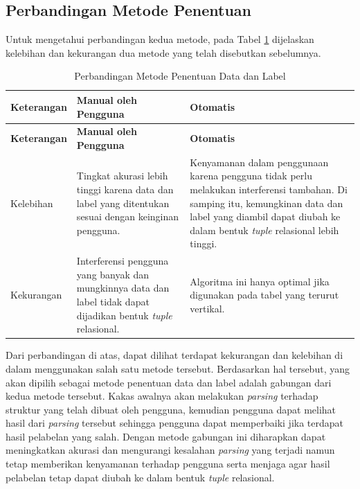 
	\subsection{Perbandingan Metode Penentuan}
	Untuk mengetahui perbandingan kedua metode, pada Tabel \ref{MetodePenentuan} dijelaskan kelebihan dan kekurangan dua metode yang telah disebutkan sebelumnya.
	\begin{small}
	\begin{longtable}{ | p{3cm} | p{4cm} | p{4cm} | }
	    \caption{Perbandingan Metode Penentuan Data dan Label}
	    \label{MetodePenentuan}\\ \hline
	    \centering\bfseries{Keterangan} & \centering\bfseries{Manual oleh Pengguna} & \centering\bfseries{Otomatis} \tabularnewline \hline
	    \endfirsthead
	    \hline
	    \centering\bfseries{Keterangan} & \centering\bfseries{Manual oleh Pengguna} & \centering\bfseries{Otomatis} \tabularnewline \hline
	    \endhead
	    Kelebihan & Tingkat akurasi lebih tinggi karena data dan label yang ditentukan sesuai dengan keinginan pengguna. & Kenyamanan dalam penggunaan karena pengguna tidak perlu melakukan interferensi tambahan. Di samping itu, kemungkinan data dan label yang diambil dapat diubah ke dalam bentuk \textit{tuple} relasional lebih tinggi. \\ \hline
	    Kekurangan & Interferensi pengguna yang banyak dan mungkinnya data dan label tidak dapat dijadikan bentuk \textit{tuple} relasional. & Algoritma ini hanya optimal jika digunakan pada tabel yang terurut vertikal. \\ \hline
  	\end{longtable}
	\end{small}
  	Dari perbandingan di atas, dapat dilihat terdapat kekurangan dan kelebihan di dalam menggunakan salah satu metode tersebut. Berdasarkan hal tersebut, yang akan dipilih sebagai metode penentuan data dan label adalah gabungan dari kedua metode tersebut. Kakas awalnya akan melakukan \textit{parsing} terhadap struktur yang telah dibuat oleh pengguna, kemudian pengguna dapat melihat hasil dari \textit{parsing} tersebut sehingga pengguna dapat memperbaiki jika terdapat hasil pelabelan yang salah. Dengan metode gabungan ini diharapkan dapat meningkatkan akurasi dan mengurangi kesalahan \textit{parsing} yang terjadi namun tetap memberikan kenyamanan terhadap pengguna serta menjaga agar hasil pelabelan tetap dapat diubah ke dalam bentuk \textit{tuple} relasional.

